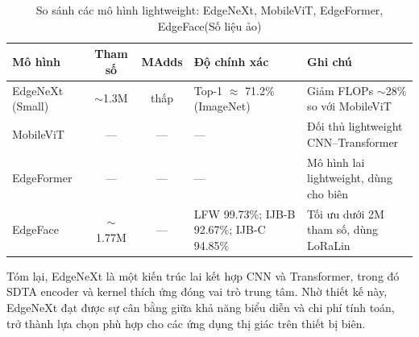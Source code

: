 \begin{table}[ht]
  \caption{So sánh các mô hình lightweight: EdgeNeXt, MobileViT, EdgeFormer, EdgeFace(Số liệu ảo)}
  \label{tab:compare_lightweight}
  \centering
  \begin{tabularx}{\textwidth}{l c c p{3cm} p{3.2cm}}
    \toprule
    \textbf{Mô hình} & \textbf{Tham số} & \textbf{MAdds} & \textbf{Độ chính xác} & \textbf{Ghi chú} \\
    \midrule
    EdgeNeXt (Small) & $\sim$1.3M & thấp & Top-1 $\approx$ 71.2\% (ImageNet) & Giảm FLOPs $\sim$28\% so với MobileViT \\
    MobileViT & — & — & — & Đối thủ lightweight CNN–Transformer \\
    EdgeFormer & — & — & — & Mô hình lai lightweight, dùng cho biên \\
    EdgeFace & $\sim$1.77M & — & LFW 99.73\%; IJB-B 92.67\%; IJB-C 94.85\% & Tối ưu dưới 2M tham số, dùng LoRaLin \\
    \bottomrule
  \end{tabularx}
\end{table} 


Tóm lại, EdgeNeXt là một kiến trúc lai kết hợp CNN và Transformer, trong đó SDTA encoder và kernel thích ứng đóng vai trò trung tâm. Nhờ thiết kế này, EdgeNeXt đạt được sự cân bằng giữa khả năng biểu diễn và chi phí tính toán, trở thành lựa chọn phù hợp cho các ứng dụng thị giác trên thiết bị biên.







